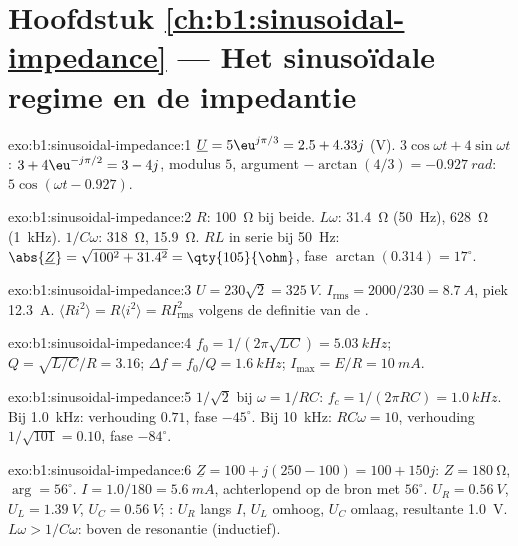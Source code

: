 \section*{Hoofdstuk \ref{ch:b1:sinusoidal-impedance} --- Het sinusoïdale regime en de impedantie}

\begin{solution}{exo:b1:sinusoidal-impedance:1}
$\underline U = 5\eu^{j\pi/3} = 2.5 + 4.33j$ (V). $3\cos\omega t +
4\sin\omega t$: $3 + 4\eu^{-j\pi/2} = 3 - 4j$, modulus $5$, argument
$-\arctan(4/3) = \qty{-0.927}{rad}$: $5\cos(\omega t - 0.927)$.
\end{solution}

\begin{solution}{exo:b1:sinusoidal-impedance:2}
$R$: \qty{100}{\ohm} bij beide. $L\omega$: \qty{31.4}{\ohm} (\qty{50}{Hz}),
\qty{628}{\ohm} (\qty{1}{kHz}). $1/C\omega$: \qty{318}{\ohm}, \qty{15.9}{\ohm}.
$RL$ in serie bij \qty{50}{Hz}: $\abs{\underline Z} = \sqrt{100^2 + 31.4^2} =
\qty{105}{\ohm}$, fase $\arctan(0.314) = 17^\circ$.
\end{solution}

\begin{solution}{exo:b1:sinusoidal-impedance:3}
$U = 230\sqrt2 = \qty{325}{V}$. $I_{\mathrm{rms}} = 2000/230 = \qty{8.7}{A}$,
piek \qty{12.3}{A}. $\langle Ri^2\rangle = R\langle i^2\rangle =
RI_{\mathrm{rms}}^2$ volgens de definitie van de .
\end{solution}

\begin{solution}{exo:b1:sinusoidal-impedance:4}
$f_0 = 1/(2\pi\sqrt{LC}) = \qty{5.03}{kHz}$; $Q = \sqrt{L/C}/R = 3.16$;
$\Delta f = f_0/Q = \qty{1.6}{kHz}$; $I_{\max} = E/R = \qty{10}{mA}$.
\end{solution}

\begin{solution}{exo:b1:sinusoidal-impedance:5}
$1/\sqrt2$ bij $\omega = 1/RC$: $f_c = 1/(2\pi RC) = \qty{1.0}{kHz}$. Bij
\qty{1.0}{kHz}: verhouding $0.71$, fase $-45^\circ$. Bij \qty{10}{kHz}:
$RC\omega = 10$, verhouding $1/\sqrt{101} = 0.10$, fase $-84^\circ$.
\end{solution}

\begin{solution}{exo:b1:sinusoidal-impedance:6}
$\underline Z = 100 + j(250 - 100) = 100 + 150j$: $Z = \qty{180}{\ohm}$,
$\arg = 56^\circ$. $I = 1.0/180 = \qty{5.6}{mA}$, achterlopend op de bron met
$56^\circ$. $U_R = \qty{0.56}{V}$, $U_L = \qty{1.39}{V}$, $U_C = \qty{0.56}{V}$;
: $U_R$ langs $I$, $U_L$ omhoog, $U_C$ omlaag, resultante \qty{1.0}{V}.
$L\omega > 1/C\omega$: boven de resonantie (inductief).
\end{solution}

